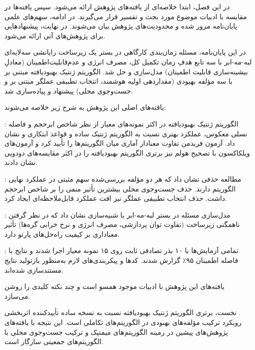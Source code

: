 
در این فصل، ابتدا خلاصه‌ای از یافته‌های پژوهش ارائه می‌شود.
سپس یافته‌ها در مقایسه با ادبیات موضوع مورد بحث و تفسیر قرار می‌گیرند.
در ادامه، سهم‌های علمی پایان‌نامه مرور شده
و محدودیت‌های پژوهش بیان می‌شوند.
در نهایت، پیشنهادهایی برای پژوهش‌های آتی ارائه می‌شود.



در این پایان‌نامه، مسئله زمان‌بندی کارگاهی در بستر یک زیرساخت رایانشی سه‌لایه‌ای
لبه-مه-ابر با سه تابع هدفِ زمان تکمیل کل، مصرف انرژی و عدم‌قابلیت‌اطمینان
(معادلِ بیشینه‌سازی قابلیت اطمینان) مدل‌سازی و حل شد.
الگوریتم ژنتیک بهبودیافته مبتنی بر  با سه مؤلفه بهبودی
(مقداردهی اولیه هوشمند، انتخاب تطبیقی عملگر مبتنی بر 
و جست‌وجوی محلی) پیشنهاد و پیاده‌سازی شد.

یافته‌های اصلی این پژوهش به شرح زیر خلاصه می‌شوند:

:
الگوریتم ژنتیک بهبودیافته در اکثر نمونه‌های معیار از نظر شاخص ابرحجم
و فاصله نسلی معکوس، عملکرد بهتری نسبت به الگوریتم ژنتیک ساده
و قواعد ابتکاری  و  نشان داد.
آزمون فریدمن تفاوت معنادار آماری میان الگوریتم‌ها را تأیید کرد
و آزمون‌های ویلکاکسون با تصحیح هولم نیز برتری الگوریتم بهبودیافته
را در اکثر مقایسه‌های دودویی نشان دادند.

:
مطالعه حذفی نشان داد که هر دو مؤلفه بررسی‌شده سهم مثبتی
در عملکرد نهایی الگوریتم دارند.
حذف جست‌وجوی محلی بیشترین تأثیر منفی را بر شاخص ابرحجم داشت.
حذف انتخاب تطبیقی عملگر نیز
افت عملکرد قابل‌ملاحظه‌ای ایجاد کرد.

:
مدل‌سازی مسئله در بستر لبه-مه-ابر با شبیه‌سازی 
نشان داد که در نظر گرفتن ناهمگنی زیرساخت (تفاوت توان پردازشی، مصرف انرژی
و نرخ خرابی گره‌ها) تأثیر معناداری بر کیفیت راه‌حل‌های پارتو دارد.

:
تمامی آزمایش‌ها با ۱۰ بذر تصادفی ثابت روی ۱۵ نمونه معیار اجرا شدند
و نتایج با فاصله اطمینان ۹۵٪ گزارش شدند.
کدها و پیکربندی‌های لازم به‌منظور بازتولید نتایج مستندسازی شده‌اند.



یافته‌های این پژوهش با ادبیات موجود همسو است و چند نکته کلیدی را روشن می‌سازد.

نخست، برتری الگوریتم ژنتیک بهبودیافته نسبت به نسخه ساده
تأییدکننده اثربخشی رویکرد ترکیب مؤلفه‌های بهبودی در الگوریتم‌های تکاملی است.
این نتیجه با یافته‌های پژوهش‌های پیشین
در زمینه الگوریتم‌های میمتیک
و ترکیب جست‌وجوی محلی با الگوریتم‌های جمعیتی سازگار است.

